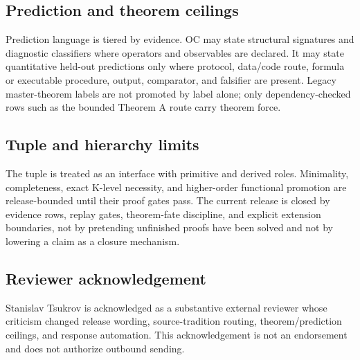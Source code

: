\subsection{Prediction and theorem ceilings}
Prediction language is tiered by evidence. OC may state structural signatures and diagnostic classifiers where operators and observables are declared. It may state quantitative held-out predictions only where protocol, data/code route, formula or executable procedure, output, comparator, and falsifier are present. Legacy master-theorem labels are not promoted by label alone; only dependency-checked rows such as the bounded Theorem A route carry theorem force.

\subsection{Tuple and hierarchy limits}
The tuple is treated as an interface with primitive and derived roles. Minimality, completeness, exact K-level necessity, and higher-order functional promotion are release-bounded until their proof gates pass. The current release is closed by evidence rows, replay gates, theorem-fate discipline, and explicit extension boundaries, not by pretending unfinished proofs have been solved and not by lowering a claim as a closure mechanism.

\subsection{Reviewer acknowledgement}
Stanislav Tsukrov is acknowledged as a substantive external reviewer whose criticism changed release wording, source-tradition routing, theorem/prediction ceilings, and response automation. This acknowledgement is not an endorsement and does not authorize outbound sending.

\clearpage
